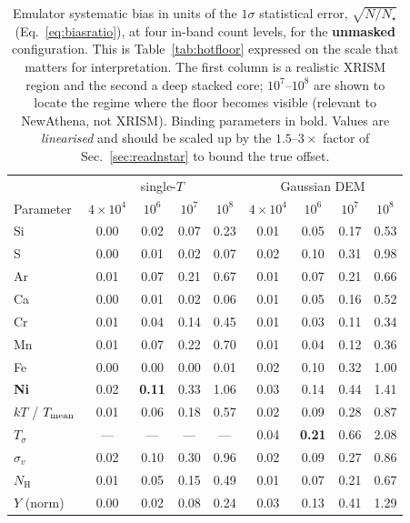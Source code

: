 \documentclass[11pt,a4paper]{article}
\newcommand{\nh}{N_{\mathrm{H}}}
\begin{document}
\begin{table}[t]
\centering
\caption{Emulator systematic bias in units of the $1\sigma$ statistical error,
$\sqrt{N/N_\star}$ (Eq.~\ref{eq:biasratio}), at four in-band count levels, for
the \textbf{unmasked} configuration. This is Table~\ref{tab:hotfloor} expressed
on the scale that matters for interpretation. The first column is a realistic
XRISM region and the second a deep stacked core; $10^{7}$--$10^{8}$ are shown to
locate the regime where the floor becomes visible (relevant to NewAthena, not
XRISM). Binding parameters in bold. Values are \emph{linearised} and should be
scaled up by the $1.5$--$3\times$ factor of Sec.~\ref{sec:readnstar} to bound
the true offset.}
\label{tab:biassigma}
\begin{tabular}{lcccc|cccc}
\toprule
& \multicolumn{4}{c|}{single-$T$} & \multicolumn{4}{c}{Gaussian DEM} \\
Parameter & $4{\times}10^4$ & $10^6$ & $10^7$ & $10^8$
          & $4{\times}10^4$ & $10^6$ & $10^7$ & $10^8$ \\
\midrule
Si       & 0.00 & 0.02 & 0.07 & 0.23 & 0.01 & 0.05 & 0.17 & 0.53 \\
S        & 0.00 & 0.01 & 0.02 & 0.07 & 0.02 & 0.10 & 0.31 & 0.98 \\
Ar       & 0.01 & 0.07 & 0.21 & 0.67 & 0.01 & 0.07 & 0.21 & 0.66 \\
Ca       & 0.00 & 0.01 & 0.02 & 0.06 & 0.01 & 0.05 & 0.16 & 0.52 \\
Cr       & 0.01 & 0.04 & 0.14 & 0.45 & 0.01 & 0.03 & 0.11 & 0.34 \\
Mn       & 0.01 & 0.07 & 0.22 & 0.70 & 0.01 & 0.04 & 0.12 & 0.36 \\
Fe       & 0.00 & 0.00 & 0.00 & 0.01 & 0.02 & 0.10 & 0.32 & 1.00 \\
\textbf{Ni} & 0.02 & \textbf{0.11} & 0.33 & 1.06
            & 0.03 & 0.14 & 0.44 & 1.41 \\
$kT$ / $T_{\rm mean}$ & 0.01 & 0.06 & 0.18 & 0.57
                      & 0.02 & 0.09 & 0.28 & 0.87 \\
\textbf{$T_\sigma$}   & --- & --- & --- & ---
                      & 0.04 & \textbf{0.21} & 0.66 & 2.08 \\
$\sigma_v$ & 0.02 & 0.10 & 0.30 & 0.96 & 0.02 & 0.09 & 0.27 & 0.86 \\
$\nh$      & 0.01 & 0.05 & 0.15 & 0.49 & 0.01 & 0.07 & 0.21 & 0.67 \\
$Y$ (norm) & 0.00 & 0.02 & 0.08 & 0.24 & 0.03 & 0.13 & 0.41 & 1.29 \\
\bottomrule
\end{tabular}
\end{table}
\end{document}
